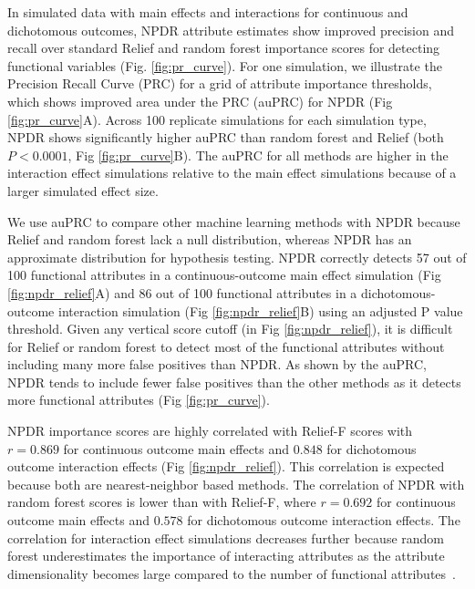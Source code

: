 \documentclass[10pt]{article}
\begin{document}
In simulated data with main effects and interactions for continuous and dichotomous outcomes, NPDR attribute estimates show improved precision and recall over standard Relief and random forest importance scores for detecting functional variables (Fig. \ref{fig:pr_curve}). For one simulation, we illustrate the Precision Recall Curve (PRC) for a grid of attribute importance thresholds, which shows improved area under the PRC (auPRC) for NPDR (Fig \ref{fig:pr_curve}A). Across 100 replicate simulations for each simulation type, NPDR shows significantly higher auPRC than random forest and Relief (both $P < 0.0001$, Fig \ref{fig:pr_curve}B). The auPRC for all methods are higher in the interaction effect simulations relative to the main effect simulations because of a larger simulated effect size. 

We use auPRC to compare other machine learning methods with NPDR because Relief and random forest lack a null distribution, whereas NPDR has an approximate distribution for hypothesis testing. NPDR correctly detects 57 out of 100 functional attributes in a continuous-outcome main effect simulation (Fig \ref{fig:npdr_relief}A) and 86 out of 100 functional attributes in a dichotomous-outcome interaction simulation (Fig \ref{fig:npdr_relief}B) using an adjusted P value threshold. Given any vertical score cutoff (in Fig \ref{fig:npdr_relief}), it is difficult for Relief or random forest to detect most of the functional attributes without including many more false positives than NPDR. As shown by the auPRC, NPDR tends to include fewer false positives than the other methods as it detects more functional attributes (Fig \ref{fig:pr_curve}).

NPDR importance scores are highly correlated with Relief-F scores with $r = 0.869$ for continuous outcome main effects and $0.848$ for dichotomous outcome interaction effects (Fig \ref{fig:npdr_relief}). This correlation is expected because both are nearest-neighbor based methods. The correlation of NPDR with random forest scores is lower than with Relief-F, where $r = 0.692$ for continuous outcome main effects and $0.578$ for dichotomous outcome interaction effects. The correlation for interaction effect simulations decreases further because random forest underestimates the importance of interacting attributes as the attribute dimensionality becomes large compared to the number of functional attributes~\cite{mckinney2009capturing,winham2012snp}.
\end{document}
